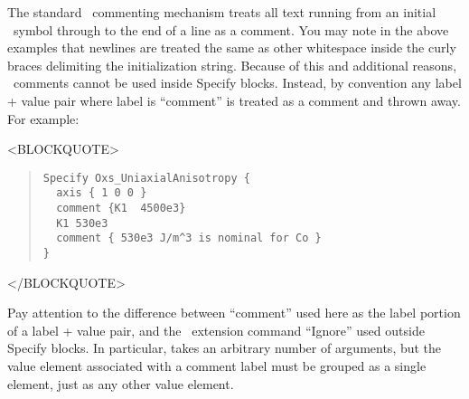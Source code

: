 %
\label{par:specifyComments}
The standard \Tcl\ commenting mechanism treats all text running from an
initial \lb\ symbol through to the end of a line as a comment.  You may
note in the above examples that newlines are treated the same as
other whitespace inside the curly braces delimiting the 
initialization string.  Because of this and additional reasons, \Tcl\
comments cannot be used inside Specify blocks.  Instead, by
convention any label + value pair where label is ``comment'' is treated
as a comment and thrown away.  For example:
\begin{rawhtml}
<BLOCKQUOTE>
\end{rawhtml}
\begin{quote}
\begin{verbatim}
Specify Oxs_UniaxialAnisotropy {
  axis { 1 0 0 }
  comment {K1  4500e3}
  K1 530e3
  comment { 530e3 J/m^3 is nominal for Co }
}
\end{verbatim}
\end{quote}
\begin{rawhtml}
</BLOCKQUOTE>
\end{rawhtml}
Pay attention to the difference between ``comment'' used here as the
label portion of a label + value pair, and the \MIF\ extension command
``Ignore'' used outside Specify blocks.  In particular, \cd{Ignore}
takes an arbitrary number of arguments, but the value element associated
with a comment label must be grouped as a single element, just as any
other value element.

